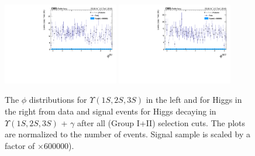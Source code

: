 \begin{figure}[!htbp]
\begin{center}
\includegraphics[width=0.45\textwidth]{figures/outputPlots/HtoUpsilon_Cat0_ZZZZZ/nEvts/data_x_mc/withKinCuts/h_withKin_Upsilon_phi}\hspace*{1.cm}
\includegraphics[width=0.45\textwidth]{figures/outputPlots/HtoUpsilon_Cat0_ZZZZZ/nEvts/data_x_mc/withKinCuts/h_withKin_Z_phi}
\end{center}\vspace*{-.5cm}
\caption{The $\phi$ distributions for $\Upsilon(1S,2S,3S)$ in the left and for Higgs in the right from data and signal events for Higgs decaying in $\Upsilon(1S,2S,3S)$ + $\gamma$ after all (Group I+II) selection cuts. The plots are normalized to the number of events. Signal sample is scaled by a factor of $\times 600000$).}
\label{fig:phiUpsilon_and_Higgs_HtoUpsilon_Cat0_groupI_plus_II}
\end{figure}



